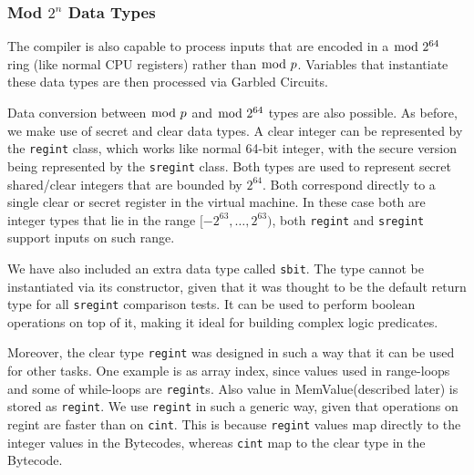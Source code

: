 \subsubsection{Mod $2^n$ Data Types}
\label{sec:mod2n}
The compiler is also capable to process inputs that are encoded in a $\bmod \; 2^{64}$  ring (like normal CPU registers) 
rather than $\bmod \; p$. 
Variables that instantiate these data types are then processed via Garbled Circuits. 

Data conversion between $\bmod \; p$ and $\bmod \; 2^{64}$ types are also possible. As before, we make use of secret and clear data types. A clear integer can be represented by the \verb|regint| class, which works like normal 64-bit integer,
with the secure version being represented by the \verb|sregint| class.
Both types are used to represent secret shared/clear integers that are bounded by $2^{64}$. 
Both correspond directly to a single clear or secret register in the virtual machine. 
In these case both are integer types that lie in the range $[-2^{63}, \dots, 2^{63})$, both \verb|regint| and \verb|sregint| support inputs on such  range.

We have also included an extra data type called \verb|sbit|. 
The type cannot be instantiated via its constructor, given that it was thought to be the default return 
type for all \verb|sregint| comparison tests. 
It can be used to perform boolean operations on top of it, making it ideal for building complex logic predicates.

Moreover, the clear type \verb|regint| was designed in such a way that it can be used for other tasks. 
One example is as array index, since values used in range-loops and some of while-loops are \verb|regint|s. 
Also value in MemValue(described later) is stored as \verb|regint|. 
We use \verb|regint| in such a generic way, given that operations on regint are faster than on \verb|cint|. 
This is because \verb+regint+ values map directly to the integer values in the Bytecodes,
whereas \verb+cint+ map to the clear type in the Bytecode.

